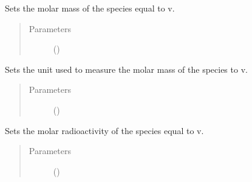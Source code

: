 \documentclass[letterpaper,10pt,openany,oneside,english]{sphinxmanual}
\begin{document}
\begin{fulllineitems}
\begin{fulllineitems}
\begin{quote}
\begin{description}
\end{description}\end{quote}

\end{fulllineitems}


\begin{fulllineitems}
\label{\detokenize{support_rst/specie:specie.Specie.SetMolarMass}}
Sets the molar mass of the species equal to v.
\begin{quote}\begin{description}
\item[{Parameters}] \leavevmode
{} () \textendash{} 

\end{description}\end{quote}

\end{fulllineitems}


\begin{fulllineitems}
\label{\detokenize{support_rst/specie:specie.Specie.SetMolarMassUnit}}
Sets the unit used to measure the molar mass of the species to v.
\begin{quote}\begin{description}
\item[{Parameters}] \leavevmode
{} () \textendash{} 

\end{description}\end{quote}

\end{fulllineitems}


\begin{fulllineitems}
\label{\detokenize{support_rst/specie:specie.Specie.SetMolarRadioactivity}}
Sets the molar radioactivity of the species equal to v.
\begin{quote}\begin{description}
\item[{Parameters}] \leavevmode
{} () \textendash{} 


\end{description}
\end{quote}
\end{fulllineitems}
\end{fulllineitems}
\end{document}
